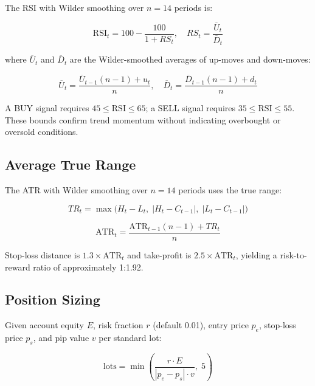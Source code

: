 \documentclass[conference]{IEEEtran}
\begin{document}
The RSI with Wilder smoothing over $n = 14$ periods is:

\begin{equation}
  \text{RSI}_t = 100 - \frac{100}{1 + RS_t},
  \quad RS_t = \frac{\overline{U}_t}{\overline{D}_t}
  \label{eq:rsi}
\end{equation}

where $\overline{U}_t$ and $\overline{D}_t$ are the Wilder-smoothed
averages of up-moves and down-moves:

\begin{equation}
  \overline{U}_t = \frac{\overline{U}_{t-1}(n-1) + u_t}{n},
  \quad
  \overline{D}_t = \frac{\overline{D}_{t-1}(n-1) + d_t}{n}
  \label{eq:rsi_smooth}
\end{equation}

A BUY signal requires $45 \le \text{RSI} \le 65$; a SELL signal
requires $35 \le \text{RSI} \le 55$.  These bounds confirm trend
momentum without indicating overbought or oversold conditions.

\subsection{Average True Range}

The ATR with Wilder smoothing over $n = 14$ periods uses the true
range:

\begin{equation}
  TR_t = \max\!\bigl(H_t - L_t,\;|H_t - C_{t-1}|,\;|L_t -
  C_{t-1}|\bigr)
  \label{eq:tr}
\end{equation}

\begin{equation}
  \text{ATR}_t = \frac{\text{ATR}_{t-1}(n-1) + TR_t}{n}
  \label{eq:atr}
\end{equation}

Stop-loss distance is $1.3 \times \text{ATR}_t$ and take-profit is
$2.5 \times \text{ATR}_t$, yielding a risk-to-reward ratio of
approximately 1:1.92.

\subsection{Position Sizing}

Given account equity $E$, risk fraction $r$ (default 0.01), entry
price $p_e$, stop-loss price $p_s$, and pip value $v$ per standard
lot:

\begin{equation}
  \text{lots} = \min\!\left(\frac{r \cdot E}{|p_e - p_s| \cdot v},
  \;5\right)
  \label{eq:lotsize}
\end{equation}
\end{document}
